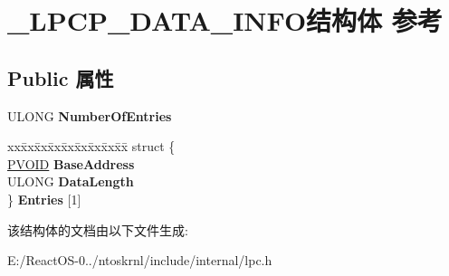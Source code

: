 \hypertarget{struct___l_p_c_p___d_a_t_a___i_n_f_o}{}\section{\+\_\+\+L\+P\+C\+P\+\_\+\+D\+A\+T\+A\+\_\+\+I\+N\+F\+O结构体 参考}
\label{struct___l_p_c_p___d_a_t_a___i_n_f_o}
\subsection*{Public 属性}
\begin{DoxyCompactItemize}
\item 
\mbox{\label{struct___l_p_c_p___d_a_t_a___i_n_f_o_a2fee6e1d7f971b525de56cb9ee828995}} 
U\+L\+O\+NG {\bfseries Number\+Of\+Entries}
\item 
\mbox{\label{struct___l_p_c_p___d_a_t_a___i_n_f_o_afddfa7700a69e99092051254ee97f6e6}} 
\begin{tabbing}
xx\=xx\=xx\=xx\=xx\=xx\=xx\=xx\=xx\=\kill
struct \{\\
\>\hyperlink{interfacevoid}{PVOID} {\bfseries BaseAddress}\\
\>ULONG {\bfseries DataLength}\\
\} {\bfseries Entries} \mbox{[}1\mbox{]}\\

\end{tabbing}\end{DoxyCompactItemize}


该结构体的文档由以下文件生成\+:\begin{DoxyCompactItemize}
\item 
E\+:/\+React\+O\+S-\/0../ntoskrnl/include/internal/lpc.\+h\end{DoxyCompactItemize}

